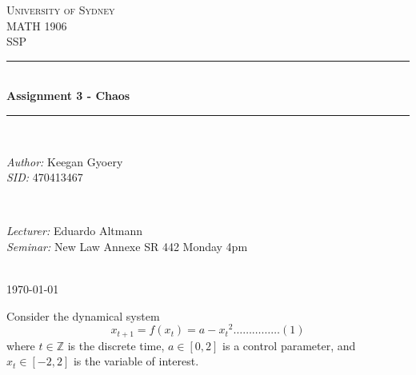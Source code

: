 \documentclass[a4paper]{article}
\begin{document}
\begin{titlepage}

\newcommand{\HRule}{\rule{\linewidth}{0.5mm}} %

\center %
 
\textsc{\LARGE University of Sydney}\\[1.5cm] %
\textsc{\Large MATH 1906}\\[0.5cm] %
\textsc{\large SSP}\\[0.5cm] %

\HRule \\[0.4cm]
{ \huge \bfseries Assignment 3 - Chaos}\\[0.4cm] %
\HRule \\[1.5cm]

\begin{minipage}{0.4\textwidth}
\begin{flushleft} \large
\emph{Author:}
Keegan Gyoery %
\\
\emph{SID:}
470413467
\end{flushleft}
\end{minipage}
~
\begin{minipage}{0.4\textwidth}
\begin{flushright} \large
\emph{Lecturer:} 
Eduardo Altmann %
\\
\emph{Seminar:}
New Law Annexe SR 442
Monday 4pm
\end{flushright}
\end{minipage}\\[4cm]

{\large \today}\\[3cm] %

\vfill %

\end{titlepage}


Consider the dynamical system 
$$\displaystyle{x_{t+1} = f(x_t) = a - {x_t}^2 \dots \dots \dots \dots \dots (1)}$$
where $\displaystyle{t \in \mathbb{Z}}$ is the discrete time, $\displaystyle{a \in [0,2]}$ is a control parameter, and $\displaystyle{x_t \in [-2,2]}$ is the variable of interest.
\end{document}
